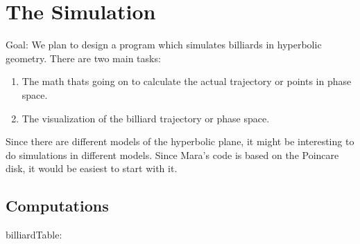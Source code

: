 \documentclass{article}
\begin{document}
\section{The Simulation}
Goal: We plan to design a program which simulates billiards in hyperbolic geometry. There are two main tasks:
\begin{enumerate}
    \item The math thats going on to calculate the actual trajectory or points in phase space.
    \item The visualization of the billiard trajectory or phase space.
\end{enumerate}

Since there are different models of the hyperbolic plane, it might be interesting to do simulations in different models. Since Mara's code is based on the Poincare disk, it would be easiest to start with it. 

\subsection{Computations}
billiardTable: 
\end{document}
